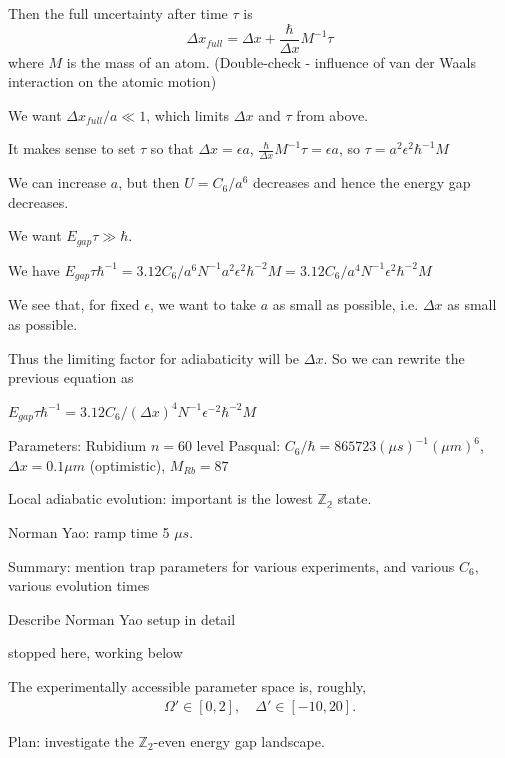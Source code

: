 \documentclass[a4paper,11pt]{article}
\theoremstyle{remark}
\theoremstyle{theorem}
\begin{document}
Then the full uncertainty after time $\tau$ is 
\begin{equation}
\Delta x_{full}= \Delta x+ \frac{\hbar}{\Delta x} M^{-1} \tau
\end{equation}
where $M$ is the mass of an atom. (Double-check - influence of van der Waals interaction on the atomic motion)

We want $\Delta x_{full}/a \ll 1$, which limits $\Delta x$ and $\tau$ from above.

It makes sense to set $\tau$ so that $\Delta x=\epsilon a$, $\frac{\hbar}{\Delta x} M^{-1} \tau =\epsilon a$, so 
$\tau=a^2\epsilon^2 \hbar^{-1} M$ 

We can increase $a$, but then $U=C_6/a^6$ decreases and hence the energy gap decreases.

We want $E_{gap} \tau \gg \hbar $.

We have $E_{gap} \tau \hbar^{-1} = 3.12 C_6/a^6 N^{-1} a^2\epsilon^2 \hbar^{-2} M = 3.12 C_6/a^4 N^{-1} \epsilon^2 \hbar^{-2} M$

We see that, for fixed $\epsilon$, we want to take $a$ as small as possible, i.e. $\Delta x$ as small as possible.

Thus the limiting factor for adiabaticity will be $\Delta x$. So we can rewrite the previous equation as

$E_{gap} \tau \hbar^{-1} = 3.12 C_6/(\Delta x)^4 N^{-1} \epsilon^{-2} \hbar^{-2} M$

Parameters:
Rubidium $n=60$ level Pasqual: $C_6/\hbar =865723 (\mu s)^{-1} (\mu m)^6$, $\Delta x=0.1\mu m$ (optimistic), $M_{Rb}=87$

Local adiabatic evolution: \cite{Richerme:2013hbx} important is the lowest $\mathbb{Z_2}$ state.

Norman Yao: ramp time 5 $\mu s$.

Summary: mention trap parameters for various experiments, and various $C_6$, various evolution times

Describe Norman Yao setup in detail

{\color{red} stopped here, working below}




The experimentally accessible parameter space is, roughly, \cite[Tab. 1]{noise-note}
\begin{align}
	\Omega' \in [0,2],\quad \Delta' \in[-10,20].
\end{align}


Plan: investigate the $\mathbb{Z}_2$-even energy gap landscape.
 
\end{document}
